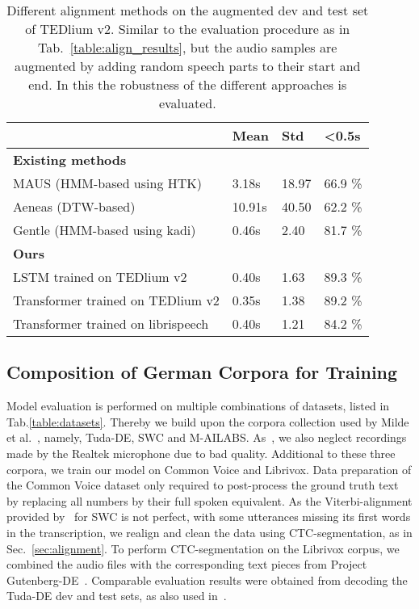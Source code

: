 \documentclass[runningheads]{llncs}
\begin{document}
\begin{table}[tb!]
	\centering
	\caption{Different alignment methods on the augmented dev and test set of TEDlium v2.
	Similar to the evaluation procedure as in Tab.~\ref{table:align_results},
	but the audio samples are augmented by adding random speech parts to their start and end.
	In this the robustness of the different approaches is evaluated.}
	\begin{tabular}{l |l |l| l}\toprule
    & \textbf{Mean} & \textbf{Std} & \textbf{<0.5s}  \\ 
    \midrule
    \multicolumn{4}{l}{\textbf{Existing methods}} \\
    \midrule
	MAUS (HMM-based using HTK) & 3.18s & 18.97 & 66.9 \% \\
	Aeneas (DTW-based) & 10.91s & 40.50 & 62.2 \%\\
	Gentle (HMM-based using kadi) & 0.46s & 2.40 & 81.7 \%\\ 
	\midrule
	\multicolumn{4}{l}{\textbf{Ours}} \\
    \midrule
	LSTM trained on TEDlium v2 & 0.40s & 1.63 & 89.3 \% \\
	Transformer trained on TEDlium v2 & 0.35s & 1.38 & 89.2 \% \\
	Transformer trained on librispeech & 0.40s & 1.21 & 84.2 \% \\
	\bottomrule 
    \end{tabular}
\label{table:align_results_augm}
\end{table}



\subsection{Composition of German Corpora for Training}
Model evaluation is performed on multiple combinations of datasets, listed in Tab.\ref{table:datasets}.
Thereby we build upon the corpora collection used by Milde et al.~\cite{Milde2018}, namely, Tuda-DE, SWC and M-AILABS.
As~\cite{Milde2018}, we also neglect recordings made by the Realtek microphone due to bad quality.
Additional to these three corpora, we train our model on Common Voice and Librivox.
Data preparation of the Common Voice dataset only required to post-process the ground truth text by replacing all numbers by their full spoken equivalent.
As the Viterbi-alignment provided by~\cite{Milde2018} for SWC is not perfect, with some utterances missing its first words in the transcription, we realign and clean the data using CTC-segmentation, as in Sec.~\ref{sec:alignment}.
To perform CTC-segmentation on the Librivox corpus,
we combined the audio files with the corresponding text pieces from Project Gutenberg-DE~\cite{Gutenberg2019}.
Comparable evaluation results were obtained from decoding the Tuda-DE dev and test sets, as also used in~\cite{Milde2018}.
\end{document}
